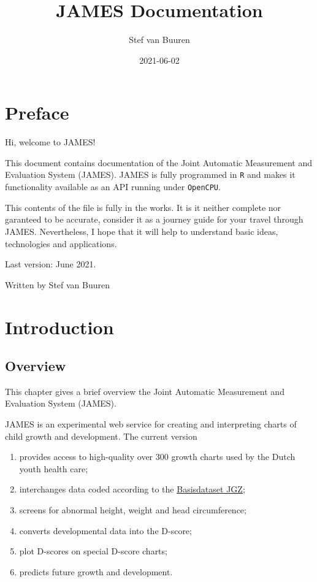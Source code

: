 \documentclass[
]{book}
\title{JAMES Documentation}
\author{Stef van Buuren}
\date{2021-06-02}
\providecommand{\tightlist}{%
  \setlength{\itemsep}{0pt}\setlength{\parskip}{0pt}}
\begin{document}
\maketitle

{
\setcounter{tocdepth}{1}
\tableofcontents
}
\hypertarget{preface}{%
\chapter*{Preface}\label{preface}}

Hi, welcome to JAMES!

This document contains documentation of the Joint Automatic Measurement and Evaluation System (JAMES). JAMES is fully programmed in \texttt{R} and makes it functionality available as an API running under \texttt{OpenCPU}.

This contents of the file is fully in the works. It is it neither complete nor garanteed to be accurate, consider it as a journey guide for your travel through JAMES. Nevertheless, I hope that it will help to understand basic ideas, technologies and applications.

Last version: June 2021.

Written by Stef van Buuren

\hypertarget{intro}{%
\chapter{Introduction}\label{intro}}

\hypertarget{overview}{%
\section{Overview}\label{overview}}

This chapter gives a brief overview the Joint Automatic Measurement and Evaluation System (JAMES).

JAMES is an experimental web service for creating and interpreting charts of child growth and
development. The current version

\begin{enumerate}
\def\labelenumi{\arabic{enumi}.}
\tightlist
\item
  provides access to high-quality over 300 growth charts used by the Dutch youth health care;
\item
  interchanges data coded according to the \href{https://www.ncj.nl/themadossiers/informatisering/basisdataset/documentatie/?cat=13}{Basisdataset JGZ};
\item
  screens for abnormal height, weight and head circumference;
\item
  converts developmental data into the D-score;
\item
  plot D-scores on special D-score charts;
\item
  predicts future growth and development.
\end{enumerate}
\end{document}
